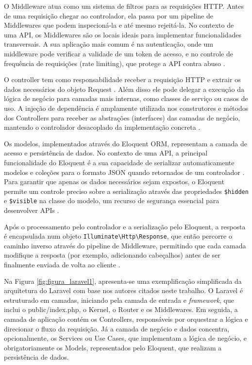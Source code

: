     \par O Middleware atua como um sistema de filtros para as requisições HTTP. Antes de uma requisição chegar ao controlador, ela passa por um pipeline de Middlewares que podem inspecioná-la e até mesmo rejeitá-la. No contexto de uma API, os Middlewares são os locais ideais para implementar funcionalidades transversais. A sua aplicação mais comum é na autenticação, onde um middleware pode verificar a validade de um token de acesso, e no controle de frequência de requisições (rate limiting), que protege a API contra abuso \cite{livro:stauffer:2023:laravel}.

    \par O controller tem como responsabilidade receber a requisição HTTP e extrair os dados necessários do objeto Request \cite{livro:stauffer:2023:laravel}. Além disso ele pode delegar a execução da lógica de negócio para camadas mais internas, como classes de serviço ou casos de uso. A injeção de dependência é amplamente utilizada nos construtores e métodos dos Controllers para receber as abstrações (interfaces) das camadas de negócio, mantendo o controlador desacoplado da implementação concreta \cite{livro:otwell:2013:laravel}.

    \par Os modelos, implementados através do Eloquent ORM, representam a camada de acesso e persistência de dados. No contexto de uma API, a principal funcionalidade do Eloquent é a sua capacidade de serializar automaticamente modelos e coleções para o formato JSON quando retornados de um controlador . Para garantir que apenas os dados necessários sejam expostos, o Eloquent permite um controle preciso sobre a serialização através das propriedades \verb|$hidden| e \verb|$visible| na classe do modelo, um recurso de segurança essencial para desenvolver APIs \cite{livro:stauffer:2023:laravel}.

    \par Após o processamento pelo controlador e a serialização pelo Eloquent, a resposta é encapsulada num objeto \verb|Illuminate\Http\Response|, que então percorre o caminho inverso através do pipeline de Middleware, permitindo que cada camada modifique a resposta (por exemplo, adicionando cabeçalhos) antes de ser finalmente enviada de volta ao cliente \cite{livro:stauffer:2023:laravel}.

    \par Na Figura \ref{fig:figura_laravel1}, apresenta-se uma exemplificação simplificada da arquitetura do Laravel com base nos autores citados neste trabalho. O Laravel é estruturado em camadas, iniciando pela camada de entrada e \textit{framework}, que inclui o public/index.php, o Kernel, o Router e os Middlewares. Em seguida, a camada de aplicação contém os Controllers, responsáveis por orquestrar a lógica e direcionar o fluxo da requisição. Já a camada de negócio e dados concentra, opcionalmente, os Services ou Use Cases, que implementam a lógica de negócio, e obrigatoriamente os Models, representados pelo Eloquent, que realizam a persistência de dados. 
    
